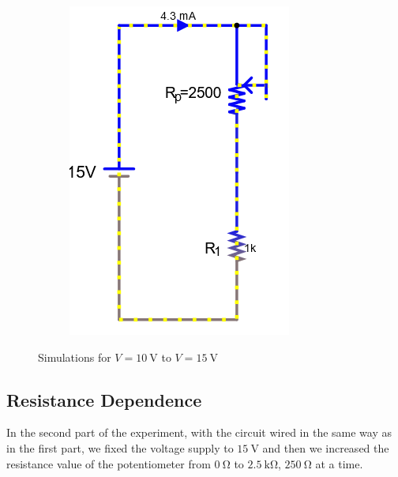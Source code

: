 \documentclass[a4paper]{article}
\begin{document}
\begin{figure}[H]
\begin{subfigure}{0.333\textwidth}
        \includegraphics[width=.9\linewidth]{amp15}
    \end{subfigure}
    \caption{Simulations for $V=\SI{10}{\volt}$ to $V=\SI{15}{\volt}$ }
    \label{fig:2}
\end{figure}
\subsection{Resistance Dependence}
In the second part of the experiment, with the circuit wired in the same way as in the first
part, we fixed the voltage
supply to $\SI{15}{\volt}$ and then we increased the resistance value of the potentiometer from
$\SI{0}{\ohm}$ to $\SI{2.5}{\kilo\ohm}$, $\SI{250}{\ohm}$ at a time.
\end{document}
